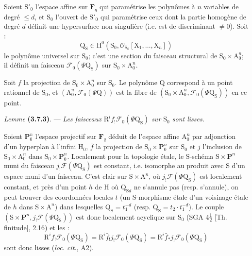 \documentclass[11pt,leqno]{article}
\begin{document}
Soient \(\mathrm S'_0\) l’espace affine sur \(\mathbf F_q\) qui paramétrise les polynômes à \(n\) variables de degré \(\leq d\), et \(\mathrm S_0\) l’ouvert de \(\mathrm S'_0\) qui paramétrise ceux dont la partie homogène de degré \(d\) définit une hypersurface non singulière (i.e. est de discriminant \(\ne0\)). Soit :
\[
\mathrm Q_{\mathrm S}\in
\mathrm H^0(\mathrm S_0,\mathscr O_{\mathrm S_0}[\mathrm X_1,\ldots,\mathrm X_n])
\]
le polynôme universel sur \(\mathrm S_0\); c’est une section du faisceau structural de \(\mathrm S_0\times\mathrm A_0^n\); il définit un faisceau \(\mathscr F_0(\Psi\mathrm Q_{\mathrm S})\) sur \(\mathrm S_0\times\mathrm A_0^n\).

Soit \(f\) la projection de \(\mathrm S_0\times\mathrm A_0^n\) sur \(\mathrm S_0\). Le polynôme \(\mathrm Q\) correspond à un point rationnel de \(\mathrm S_0\), et \((\mathrm A_0^n,\mathscr F_0(\Psi\mathrm Q))\) est la fibre de \((\mathrm S_0\times\mathrm A_0^n,\mathscr F_0(\Psi\mathrm Q_{\mathrm S}))\) en ce point.

\textit{Lemme} \textbf{(3.7.3)}. — \textit{Les faisceaux \(\mathrm R^if_!\mathscr F_0(\Psi\mathrm Q_{\mathrm S})\) sur \(\mathrm S_0\) sont lisses.}

Soient \(\mathbf P_0^n\) l’espace projectif sur \(\mathbf F_q\) déduit de l’espace affine \(\mathrm A_0^n\) par adjonction d’un hyperplan à l’infini \(\mathrm H_0\), \(\bar f\) la projection de \(\mathrm S_0\times\mathbf P_0^n\) sur \(\mathrm S_0\) et \(j\) l’inclusion de \(\mathrm S_0\times\mathrm A_0^n\) dans \(\mathrm S_0\times\mathbf P_0^n\). Localement pour la topologie étale, le \(\mathrm S\)-schéma \(\mathrm S\times\mathbf P^n\) muni du faisceau \(j_!\mathscr F(\Psi\mathrm Q_{\mathrm S})\) est constant, i.e. isomorphe au produit avec \(\mathrm S\) d’un espace muni d’un faisceau. C’est clair sur \(\mathrm S\times\mathrm A^n\), où \(j_!\mathscr F(\Psi\mathrm Q_{\mathrm S})\) est localement constant, et près d’un point \(h\) de \(\mathrm H\) où \(\mathrm Q_{\mathrm S d}\) ne s’annule pas (resp. s’annule), on peut trouver des coordonnées locales \(t\) (un \(\mathrm S\)-morphisme étale d’un voisinage étale de \(h\) dans \(\mathrm S\times\mathrm A^n\)) dans lesquelles \(\mathrm Q_{\mathrm S}=t_1^{-d}\) (resp. \(\mathrm Q_{\mathrm S}=t_2\cdot t_1^{-d}\)). Le couple \((\mathrm S\times\mathbf P^n,j_!\mathscr F(\Psi\mathrm Q_{\mathrm S}))\) est donc localement acyclique sur \(\mathrm S_0\) (SGA \(4\frac{1}{2}\) [Th. finitude], 2.16) et les :
\[
\mathrm R^if_!\mathscr F_0(\Psi\mathrm Q_{\mathrm S})
=
\mathrm R^i\bar f_!j_!\mathscr F_0(\Psi\mathrm Q_{\mathrm S})
=
\mathrm R^i\bar f_*j_!\mathscr F_0(\Psi\mathrm Q_{\mathrm S})
\]
sont donc lisses (\textit{loc. cit.}, A2).
\end{document}
